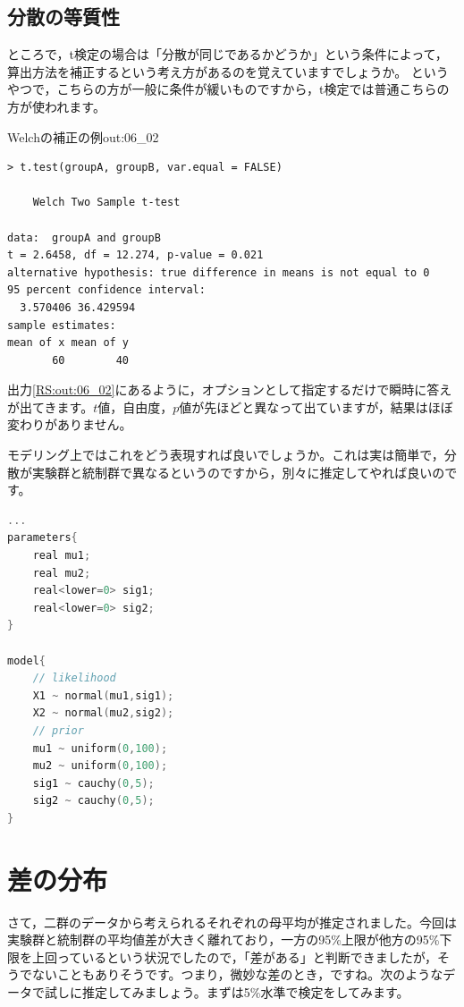 \documentclass{ltjsbook}
\begin{document}
\subsection{分散の等質性}
ところで，t検定の場合は「分散が同じであるかどうか」という条件によって，算出方法を補正するという考え方があるのを覚えていますでしょうか。
というやつで，こちらの方が一般に条件が緩いものですから，t検定では普通こちらの方が使われます。
\begin{Rscreen}{Welchの補正の例}{out:06_02}
	\begin{verbatim}
> t.test(groupA, groupB, var.equal = FALSE)

	Welch Two Sample t-test

data:  groupA and groupB
t = 2.6458, df = 12.274, p-value = 0.021
alternative hypothesis: true difference in means is not equal to 0
95 percent confidence interval:
  3.570406 36.429594
sample estimates:
mean of x mean of y 
       60        40 
    \end{verbatim}
\end{Rscreen}
出力\ref{RS:out:06_02}にあるように，オプションとして指定するだけで瞬時に答えが出てきます。$t$値，自由度，$p$値が先ほどと異なって出ていますが，結果はほぼ変わりがありません。

モデリング上ではこれをどう表現すれば良いでしょうか。これは実は簡単で，分散が実験群と統制群で異なるというのですから，別々に推定してやれば良いのです。

\begin{lstlisting}[language=C++,label={code:06_04},caption={分散が異なる場合の推定モデル}]
        ...
parameters{
    real mu1;
    real mu2;
    real<lower=0> sig1;
    real<lower=0> sig2;
}

model{
    // likelihood
    X1 ~ normal(mu1,sig1);
    X2 ~ normal(mu2,sig2);
    // prior
    mu1 ~ uniform(0,100);
    mu2 ~ uniform(0,100);
    sig1 ~ cauchy(0,5);
    sig2 ~ cauchy(0,5);
}
\end{lstlisting}

\section{差の分布}
\label{ROPE}
さて，二群のデータから考えられるそれぞれの母平均が推定されました。今回は実験群と統制群の平均値差が大きく離れており，一方の95\%上限が他方の95\%下限を上回っているという状況でしたので，「差がある」と判断できましたが，そうでないこともありそうです。つまり，微妙な差のとき，ですね。次のようなデータで試しに推定してみましょう。まずは5\%水準で検定をしてみます。
\end{document}
